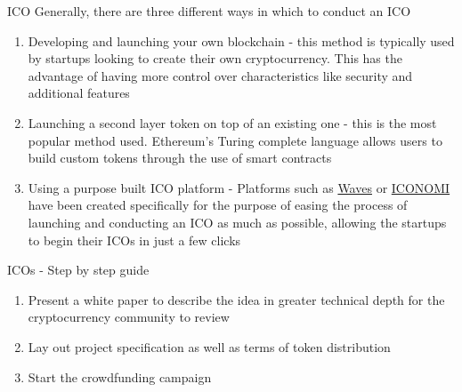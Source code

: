 \documentclass[10pt]{beamer}
\begin{document}

\begin{frame}{ICO}
	Generally, there are three different ways in which to conduct an ICO
	\begin{enumerate}
		\item Developing and launching your own blockchain - this method is typically used by startups looking to create their own cryptocurrency. This has the advantage of having more control over characteristics like security and additional features
		\item Launching a second layer token on top of an existing one - this is the most popular method used. Ethereum's Turing complete language allows users to build custom tokens through the use of smart contracts
		\item Using a purpose built ICO platform - Platforms such as \href{https://wavesplatform.com/product}{Waves} or \href{https://www.iconomi.net}{ICONOMI} have been created specifically for the purpose of easing the process of launching and conducting an ICO as much as possible, allowing the startups to begin their ICOs in just a few clicks
	\end{enumerate}
\end{frame}


\begin{frame}{ICOs - Step by step guide}
	\begin{enumerate}
		\item Present a white paper to describe the idea in greater technical depth for the cryptocurrency community to review
		\item Lay out project specification as well as terms of token distribution
		\item Start the crowdfunding campaign
	\end{enumerate}
\end{frame}


\end{document}
